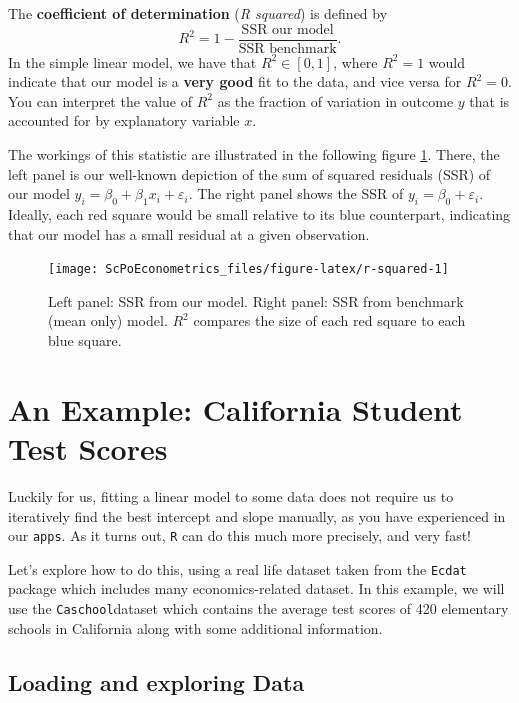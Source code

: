 \documentclass[]{book}
\newenvironment{tip}{\begin{tcolorbox}[colback=green!5!white,colframe=green,title=\textbf{Tip:}]}{\end{tcolorbox}}
\theoremstyle{definition}
\theoremstyle{definition}
\theoremstyle{definition}
\theoremstyle{remark}
\begin{document}
\begin{tip}
The \textbf{coefficient of determination} (\emph{R squared}) is defined
by \[R^2 = 1 - \frac{\text{SSR our model}}{\text{SSR benchmark}}.\] In
the simple linear model, we have that \(R^2 \in [0,1]\), where
\(R^2 = 1\) would indicate that our model is a \textbf{very good} fit to
the data, and vice versa for \(R^2 = 0\). You can interpret the value of
\(R^2\) as the fraction of variation in outcome \(y\) that is accounted
for by explanatory variable \(x\).
\end{tip}

 The workings of this statistic are illustrated in the following figure
\ref{fig:r-squared}. There, the left panel is our well-known depiction
of the sum of squared residuals (SSR) of our model
\(y_i = \beta_0 + \beta_1 x_i + \varepsilon_i\). The right panel shows
the SSR of \(y_i = \beta_0 + \varepsilon_i\). Ideally, each red square
would be small relative to its blue counterpart, indicating that our
model has a small residual at a given observation.

\begin{figure}

{\centering \texttt{[image: ScPoEconometrics\_files/figure-latex/r-squared-1]} 

}

\caption{Left panel: SSR from our model. Right panel: SSR from benchmark (mean only) model. $R^2$ compares the size of each red square to each blue square.}\label{fig:r-squared}
\end{figure}

\section{An Example: California Student Test Scores}\label{lm-example1}

Luckily for us, fitting a linear model to some data does not require us
to iteratively find the best intercept and slope manually, as you have
experienced in our \texttt{apps}. As it turns out, \texttt{R} can do
this much more precisely, and very fast!

Let's explore how to do this, using a real life dataset taken from the
\texttt{Ecdat} package which includes many economics-related dataset. In
this example, we will use the \texttt{Caschool}dataset which contains
the average test scores of 420 elementary schools in California along
with some additional information.

\subsection{Loading and exploring
Data}\label{loading-and-exploring-data}
\end{document}

